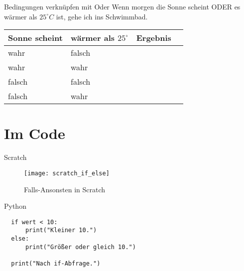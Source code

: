 \documentclass{\VorlagenPfad/coderdojokabeamer}
\begin{document}
\begin{frame}{Bedingungen verknüpfen mit Oder}
	Wenn morgen die Sonne scheint ODER es wärmer als $25^{\circ}C$ ist, gehe ich ins Schwimmbad.
	\begin{table}[t,clr]
		\begin{center}
			\begin{tabular}{|l|l|l|l|}
				\hline
				Sonne scheint	& wärmer als $25^{\circ}$	& Ergebnis	\\ \hline\hline
				wahr			& falsch					&			\\ \hline
				wahr			& wahr						&			\\ \hline
				falsch			& falsch					&			\\ \hline
				falsch			& wahr						&			\\ \hline
			\end{tabular}
		\end{center}
	\end{table}
\end{frame}

\section{Im Code}

\begin{frame}{Scratch}
  \begin{figure}[t]
    \centering
    \texttt{[image: scratch\_if\_else]}
    \caption{Falls-Ansonsten in Scratch}
  \end{figure}
\end{frame}

\begin{frame}[fragile]{Python}
  \begin{verbatim}
  if wert < 10:
      print("Kleiner 10.")
  else:
      print("Größer oder gleich 10.")

  print("Nach if-Abfrage.")
  \end{verbatim}
\end{frame}
\end{document}
